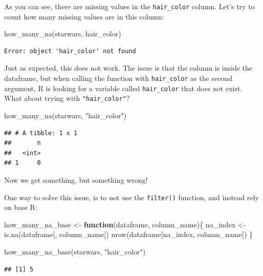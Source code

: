 \documentclass[
]{article}
\newenvironment{Shaded}{\begin{snugshade}}{\end{snugshade}}
\newcommand{\ControlFlowTok}[1]{\textcolor[rgb]{0.13,0.29,0.53}{\textbf{#1}}}
\newcommand{\FunctionTok}[1]{\textcolor[rgb]{0.00,0.00,0.00}{#1}}
\newcommand{\NormalTok}[1]{#1}
\newcommand{\OtherTok}[1]{\textcolor[rgb]{0.56,0.35,0.01}{#1}}
\newcommand{\StringTok}[1]{\textcolor[rgb]{0.31,0.60,0.02}{#1}}
\begin{document}
As you can see, there are missing values in the \texttt{hair\_color} column. Let's try to count how many
missing values are in this column:

\begin{Shaded}
\begin{Highlighting}[]
\FunctionTok{how\_many\_na}\NormalTok{(starwars, hair\_color)}
\end{Highlighting}
\end{Shaded}

\begin{verbatim}
Error: object 'hair_color' not found
\end{verbatim}

Just as expected, this does not work. The issue is that the column is inside the dataframe,
but when calling the function with \texttt{hair\_color} as the second argument, R is looking for a
variable called \texttt{hair\_color} that does not exist. What about trying with \texttt{"hair\_color"}?

\begin{Shaded}
\begin{Highlighting}[]
\FunctionTok{how\_many\_na}\NormalTok{(starwars, }\StringTok{"hair\_color"}\NormalTok{)}
\end{Highlighting}
\end{Shaded}

\begin{verbatim}
## # A tibble: 1 x 1
##       n
##   <int>
## 1     0
\end{verbatim}

Now we get something, but something wrong!

One way to solve this issue, is to not use the \texttt{filter()} function, and instead rely on base R:

\begin{Shaded}
\begin{Highlighting}[]
\NormalTok{how\_many\_na\_base }\OtherTok{\textless{}{-}} \ControlFlowTok{function}\NormalTok{(dataframe, column\_name)\{}
\NormalTok{  na\_index }\OtherTok{\textless{}{-}} \FunctionTok{is.na}\NormalTok{(dataframe[, column\_name])}
  \FunctionTok{nrow}\NormalTok{(dataframe[na\_index, column\_name])}
\NormalTok{\}}

\FunctionTok{how\_many\_na\_base}\NormalTok{(starwars, }\StringTok{"hair\_color"}\NormalTok{)}
\end{Highlighting}
\end{Shaded}

\begin{verbatim}
## [1] 5
\end{verbatim}
\end{document}
